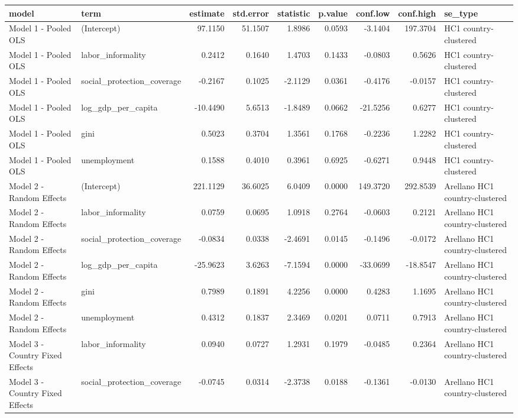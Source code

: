 
\begin{tabular}{llrrrrrrl}
\toprule
model & term & estimate & std.error & statistic & p.value & conf.low & conf.high & se\_type\\
\midrule
Model 1 - Pooled OLS & (Intercept) & 97.1150 & 51.1507 & 1.8986 & 0.0593 & -3.1404 & 197.3704 & HC1 country-clustered\\
Model 1 - Pooled OLS & labor\_informality & 0.2412 & 0.1640 & 1.4703 & 0.1433 & -0.0803 & 0.5626 & HC1 country-clustered\\
Model 1 - Pooled OLS & social\_protection\_coverage & -0.2167 & 0.1025 & -2.1129 & 0.0361 & -0.4176 & -0.0157 & HC1 country-clustered\\
Model 1 - Pooled OLS & log\_gdp\_per\_capita & -10.4490 & 5.6513 & -1.8489 & 0.0662 & -21.5256 & 0.6277 & HC1 country-clustered\\
Model 1 - Pooled OLS & gini & 0.5023 & 0.3704 & 1.3561 & 0.1768 & -0.2236 & 1.2282 & HC1 country-clustered\\
\addlinespace
Model 1 - Pooled OLS & unemployment & 0.1588 & 0.4010 & 0.3961 & 0.6925 & -0.6271 & 0.9448 & HC1 country-clustered\\
Model 2 - Random Effects & (Intercept) & 221.1129 & 36.6025 & 6.0409 & 0.0000 & 149.3720 & 292.8539 & Arellano HC1 country-clustered\\
Model 2 - Random Effects & labor\_informality & 0.0759 & 0.0695 & 1.0918 & 0.2764 & -0.0603 & 0.2121 & Arellano HC1 country-clustered\\
Model 2 - Random Effects & social\_protection\_coverage & -0.0834 & 0.0338 & -2.4691 & 0.0145 & -0.1496 & -0.0172 & Arellano HC1 country-clustered\\
Model 2 - Random Effects & log\_gdp\_per\_capita & -25.9623 & 3.6263 & -7.1594 & 0.0000 & -33.0699 & -18.8547 & Arellano HC1 country-clustered\\
\addlinespace
Model 2 - Random Effects & gini & 0.7989 & 0.1891 & 4.2256 & 0.0000 & 0.4283 & 1.1695 & Arellano HC1 country-clustered\\
Model 2 - Random Effects & unemployment & 0.4312 & 0.1837 & 2.3469 & 0.0201 & 0.0711 & 0.7913 & Arellano HC1 country-clustered\\
Model 3 - Country Fixed Effects & labor\_informality & 0.0940 & 0.0727 & 1.2931 & 0.1979 & -0.0485 & 0.2364 & Arellano HC1 country-clustered\\
Model 3 - Country Fixed Effects & social\_protection\_coverage & -0.0745 & 0.0314 & -2.3738 & 0.0188 & -0.1361 & -0.0130 & Arellano HC1 country-clustered\\

\end{tabular}
